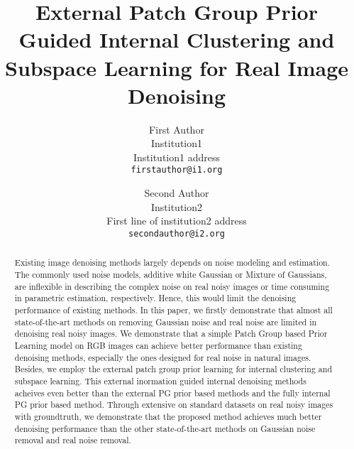 \documentclass[10pt,twocolumn,letterpaper]{article}
\begin{document}
\title{External Patch Group Prior Guided Internal Clustering and Subspace Learning for Real Image Denoising}

\author{First Author\\
Institution1\\
Institution1 address\\
{\tt\small firstauthor@i1.org}
\and
Second Author\\
Institution2\\
First line of institution2 address\\
{\tt\small secondauthor@i2.org}
}

\maketitle

\begin{abstract}
Existing image denoising methods largely depends on noise modeling and estimation. The commonly used noise models, additive white Gaussian or Mixture of Gaussians, are inflexible in describing the complex noise on real noisy images or time consuming in parametric estimation, respectively. Hence, this would limit the denoising performance of existing methods. In this paper, we firstly demonstrate that almost all state-of-the-art methods on removing Gaussian noise and real noise are limited in denoising real noisy images. We demonstrate that a simple Patch Group based Prior Learning model on RGB images can achieve better performance than existing denoising methods, especially the ones designed for real noise in natural images. Besides, we employ the external patch group prior learning for internal clustering and subspace learning. This external inormation guided internal denoising methods acheives even better than the external PG prior based methods and the fully internal PG prior based method. Through extensive on standard datasets on real noisy images with groundtruth, we demonstrate that the proposed method achieves much better denoising performance than the other state-of-the-art methods on Gaussian noise removal and real noise removal. 
\end{abstract}

\end{document}
